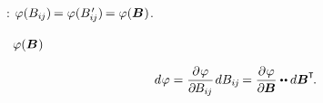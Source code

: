\vspace{-0.25em} \noindent
{}   :
${\varphi(B_{i\hspace{-0.1ex}j}) \hspace{-0.2ex} = \varphi(B\hspace{.16ex}'_{\hspace{-0.32ex}i\hspace{-0.1ex}j}) \hspace{-0.2ex} = \varphi(\bm{B}\hspace{.1ex})}$.

~${\varphi(\bm{B}\hspace{.1ex})}$ 

\nopagebreak\vspace{-0.2em}\begin{equation}
d \hspace{.1ex} \varphi
= \displaystyle \frac{\partial \hspace{.1ex} \varphi}{\partial \hspace{-0.2ex} B_{i\hspace{-0.1ex}j}} \hspace{.2ex} d B_{i\hspace{-0.1ex}j} \hspace{-0.2ex}
= \displaystyle \frac{\partial \hspace{.1ex} \varphi}{\partial \hspace{-0.1ex} \bm{B}} \dotdotp d \bm{B}^{\T}
\hspace{-0.25ex} .
\end{equation}

